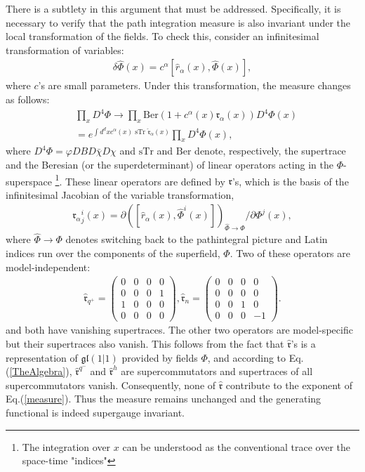 \documentclass[final,5p,10pt,times,twocolumn,year]{elsarticle}
\begin{document}
There is a subtlety in this argument that must be addressed. Specifically, it is necessary to verify that the path integration measure is also invariant under the local transformation of the fields. To check this, consider an infinitesimal transformation of variables:
\begin{eqnarray}
    \delta \hat \Phi(x) = c^\alpha [\hat r_\alpha(x), \hat \Phi(x)],
\end{eqnarray}
where $c$'s are small parameters. Under this transformation, the measure changes as follows:
\begin{eqnarray}
&\prod\nolimits_x D^4\Phi  \to \prod\nolimits_x \text{Ber}(1 + c^\alpha(x) \mathfrak{r}_\alpha(x)) D^4\Phi(x) \nonumber \\&= e^{ \int d^{d}x c^\alpha(x) \text{ sTr }\hat{\mathfrak{r}}_\alpha(x)} \prod\nolimits_x D^4\Phi(x), \label{measure}
\end{eqnarray}
where $D^4\Phi = \varphi DB D\bar\chi D\chi $ and $\text{sTr}$ and $\text{Ber}$ denote, respectively, the supertrace and the Beresian (or the superdeterminant) of linear operators acting in the $\Phi$-superspace \footnote{The integration over $x$ can be understood as the conventional trace over the space-time "indices"}. These linear operators are defined by $\mathfrak{r}$'s, which is the basis of the infinitesimal Jacobian of the variable transformation,
\begin{eqnarray}
    \mathfrak{r}_\alpha{}^i_j(x) = \partial \left([\hat r_\alpha(x), \hat \Phi^i(x)]\right)_{\hat \Phi \to \Phi}/ \partial \Phi^j(x),
\end{eqnarray}
where $\hat \Phi \to \Phi$ denotes switching back to the pathintegral picture and Latin indices run over the components of the superfield, $\Phi$. Two of these operators are model-independent:
\begin{eqnarray}
\hat{\mathfrak{r}}_{q^+} = \left(\begin{array}{cccc}
0&0&0&0\\
0&0&0&1\\
1&0&0&0\\
0&0&0&0
\end{array}\right), 
\hat{\mathfrak{r}}_{n} = \left(\begin{array}{cccc}
0&0&0&0\\
0&0&0&0\\
0&0&1&0\\
0&0&0&-1
\end{array}\right).
\end{eqnarray}
and both have vanishing supertraces. The other two operators are model-specific but their supertraces also vanish. This follows from the fact that $\hat{\mathfrak{r}}$'s is a representation of $\mathfrak{gl}(1|1)$ provided by fields $\Phi$, and according to Eq.(\ref{TheAlgebra}), $\hat{\mathfrak{r}}^{q^-}$ and $\hat{\mathfrak{r}}^{h}$ are supercommutators and supertraces of all supercommutators vanish. Consequently, none of $\hat{\mathfrak{r}}$ contribute to the exponent of Eq.(\ref{measure}). Thus the measure remains unchanged and the generating functional is indeed supergauge invariant.
\end{document}
